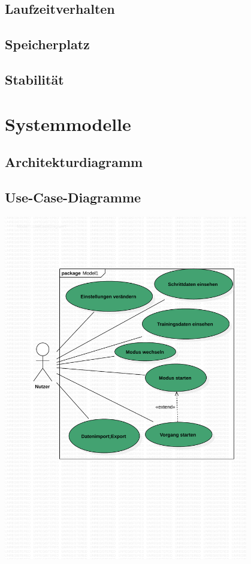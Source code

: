 \documentclass[a4paper,12pt]{article}
\begin{document}
\subsection{Laufzeitverhalten}
\subsection{Speicherplatz}
\subsection{Stabilität}

\section{Systemmodelle}
  \subsection{Architekturdiagramm}
  \subsection{Use-Case-Diagramme}
\begin{center}
\includegraphics[width=0.8\textwidth]{Vorlaeufiges Use-Case Diagram.pdf}
\end{center}
\end{document}

